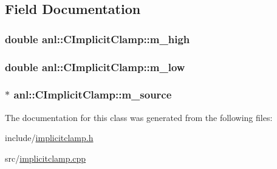 \subsection{Field Documentation}
\hypertarget{classanl_1_1CImplicitClamp_a2c3bcf1591133ba5e413ec31b613f6ce}{
\subsubsection[{m\_\-high}]{\setlength{\rightskip}{0pt plus 5cm}double {\bf anl::CImplicitClamp::m\_\-high}}}
\label{classanl_1_1CImplicitClamp_a2c3bcf1591133ba5e413ec31b613f6ce}
\hypertarget{classanl_1_1CImplicitClamp_a18025dbdf7677d1eba58921441ce9829}{
\subsubsection[{m\_\-low}]{\setlength{\rightskip}{0pt plus 5cm}double {\bf anl::CImplicitClamp::m\_\-low}}}
\label{classanl_1_1CImplicitClamp_a18025dbdf7677d1eba58921441ce9829}
\hypertarget{classanl_1_1CImplicitClamp_a633534f6ca40ae2dfb627d2ed8e08fd5}{
\subsubsection[{m\_\-source}]{$\ast$ {\bf anl::CImplicitClamp::m\_\-source}}}
\label{classanl_1_1CImplicitClamp_a633534f6ca40ae2dfb627d2ed8e08fd5}


The documentation for this class was generated from the following files:\begin{DoxyCompactItemize}
\item 
include/\hyperlink{implicitclamp_8h}{implicitclamp.h}\item 
src/\hyperlink{implicitclamp_8cpp}{implicitclamp.cpp}\end{DoxyCompactItemize}
